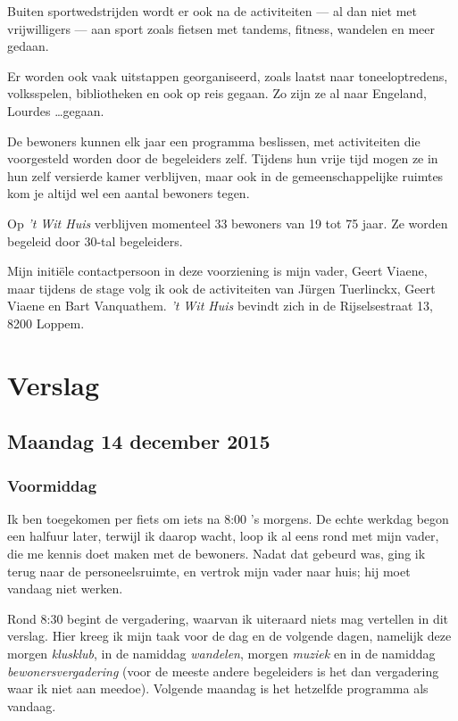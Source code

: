 \documentclass[a4paper,12pt]{article}
\begin{document}
Buiten sportwedstrijden wordt er ook na de activiteiten --- al dan niet met vrijwilligers --- aan sport zoals fietsen met tandems, fitness, wandelen en meer gedaan.

Er worden ook vaak uitstappen georganiseerd, zoals laatst naar toneeloptredens, volksspelen, bibliotheken en ook op reis gegaan. Zo zijn ze al naar Engeland, Lourdes \dots gegaan.

De bewoners kunnen elk jaar een programma beslissen, met activiteiten die voorgesteld worden door de begeleiders zelf. Tijdens hun vrije tijd mogen ze in hun zelf versierde kamer verblijven, maar ook in de gemeenschappelijke ruimtes kom je altijd wel een aantal bewoners tegen.

Op \emph{'t Wit Huis} verblijven momenteel 33 bewoners van 19 tot 75 jaar. Ze worden begeleid door 30-tal begeleiders.

Mijn initiële contactpersoon in deze voorziening is mijn vader, Geert Viaene, maar tijdens de stage volg ik ook de activiteiten van Jürgen Tuerlinckx, Geert Viaene en Bart Vanquathem. \emph{'t Wit Huis} bevindt zich in de Rijselsestraat 13, 8200 Loppem.

\section{Verslag}


\subsection{Maandag 14 december 2015}

\subsubsection{Voormiddag}

Ik ben toegekomen per fiets om iets na 8:00 's morgens. De echte werkdag begon een halfuur later, terwijl ik daarop wacht, loop ik al eens rond met mijn vader, die me kennis doet maken met de bewoners. Nadat dat gebeurd was, ging ik terug naar de personeelsruimte, en vertrok mijn vader naar huis; hij moet vandaag niet werken.

Rond 8:30 begint de vergadering, waarvan ik uiteraard niets mag vertellen in dit verslag. Hier kreeg ik mijn taak voor de dag en de volgende dagen, namelijk deze morgen \emph{klusklub}, in de namiddag \emph{wandelen}, morgen \emph{muziek} en in de namiddag \emph{bewonersvergadering} (voor de meeste andere begeleiders is het dan vergadering waar ik niet aan meedoe). Volgende maandag is het hetzelfde programma als vandaag.
\end{document}
